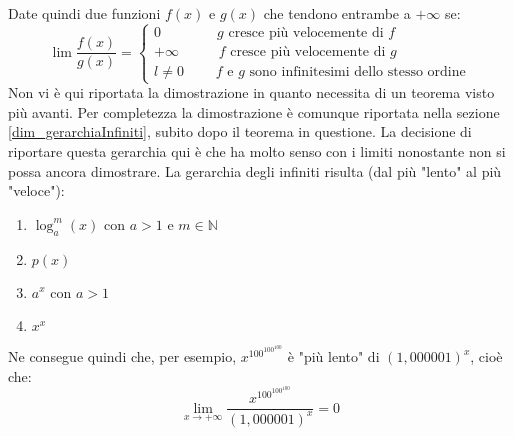 Date quindi due funzioni $f(x)$ e $g(x)$ che tendono entrambe a $+ \infty$ se:
\begin{equation*}
    \lim \dfrac{f(x)}{g(x)} =
    \begin{cases*}
        0 \qquad \qquad g \text{ cresce più velocemente di } f\\
        +\infty \qquad \;\;\; f \text{ cresce più velocemente di } g\\
        l \neq 0 \qquad \; \text{$f$ e $g$ sono infinitesimi dello stesso ordine}
    \end{cases*}
\end{equation*}
Non vi è qui riportata la dimostrazione in quanto necessita di un teorema visto più avanti. Per completezza la dimostrazione è comunque riportata nella sezione \ref{dim_gerarchiaInfiniti}, subito dopo il teorema in questione. La decisione di riportare questa gerarchia qui è che ha molto senso con i limiti nonostante non si possa ancora dimostrare. La gerarchia degli infiniti risulta (dal più "lento" al più "veloce"):
\begin{enumerate}
	\item $\log_a^m (x)$ con $a > 1$ e $m \in \mathbb{N}$
	\item $p(x)$
	\item $a^x$ con $a > 1$
	\item $x^x$
\end{enumerate}
Ne consegue quindi che, per esempio, $x^{100^{100^{100}}}$ è "più lento" di $(1,000001)^x$, cioè che:
\begin{equation*}
    \lim_{x \to + \infty} \dfrac{x^{100^{100^{100}}}}{(1,000001)^x} = 0
\end{equation*}

